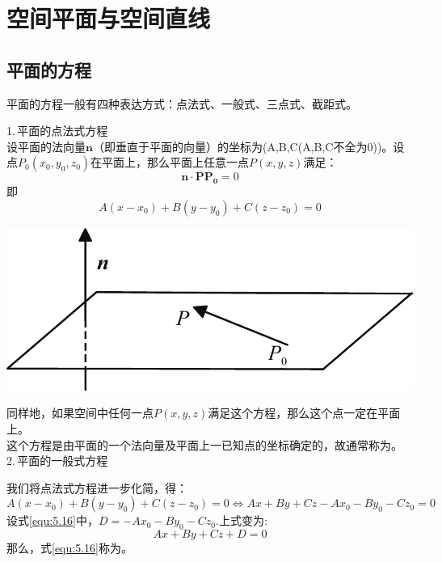 \section{空间平面与空间直线}
\subsection{平面的方程}
平面的方程一般有四种表达方式：点法式、一般式、三点式、截距式。
\\ 

\noindent
\begin{minipage}{0.6\linewidth}
1.$\,$平面的点法式方程\\ 
\hspace*{2em}设平面的法向量$\boldsymbol{n}$（即垂直于平面的向量）的坐标为(A,B,C(A,B,C不全为0))。设点$P_0(x_0,y_0,z_0)$在平面上，那么平面上任意一点$P(x,y,z)$满足：
\begin{equation}
	\nonumber
	\boldsymbol{n}\cdot\boldsymbol{PP_0}=0
\end{equation}
即\begin{equation}
	A(x-x_0)+B(y-y_0)+C(z-z_0)=0
	\end{equation}
\vspace*{0.1em}
\end{minipage}
\begin{minipage}{0.4\linewidth}
	\centering
	\includegraphics[width = 0.9\linewidth]{pic/C-5/plane1}
	\vspace*{-1em}
	\label{平面的点法式方程}
\end{minipage}

同样地，如果空间中任何一点$P(x,y,z)$满足这个方程，那么这个点一定在平面上。
\\这个方程是由平面的一个法向量及平面上一已知点的坐标确定的，故通常称为。\\
2.$\,$平面的一般式方程
\par 我们将点法式方程进一步化简，得：
\begin{equation}
	A(x-x_0)+B(y-y_0)+C(z-z_0)=0\Leftrightarrow Ax+By+Cz-Ax_0-By_0-Cz_0=0
	\label{equ:5.16}
\end{equation}
设式\eqref{equ:5.16}中，$D=-Ax_0-By_0-Cz_0$.上式变为:
\begin{equation}
	Ax+By+Cz+D=0
\end{equation}
那么，式\ref{equ:5.16}称为。\\

